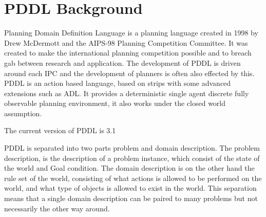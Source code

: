 \section{PDDL \textbf{Background}}
Planning Domain Definition Language is a planning language created in 1998 by Drew McDermott and the AIPS-98 Planning Competition Committee. It was created to make the international planning competition possible and to breach gab between research and application. The development of PDDL is driven around each IPC and the  development of planners is often also effected by this.
PDDL is an action based language, based on strips with some advanced extensions such as ADL. It provides a deterministic single agent discrete fully observable planning environment, it also works under the closed world assumption. 

The current version of PDDL is 3.1

PDDL is separated into two parts problem and domain description. The problem description, is the description of a problem instance, which consist of the state of the world and Goal condition. The domain description is on the other hand the rule set of the world, consisting of what actions is allowed to be performed on the world, and what type of objects is allowed to exist in the world. This separation means that a single domain description can be paired to many problems but not necessarily the other way around.

